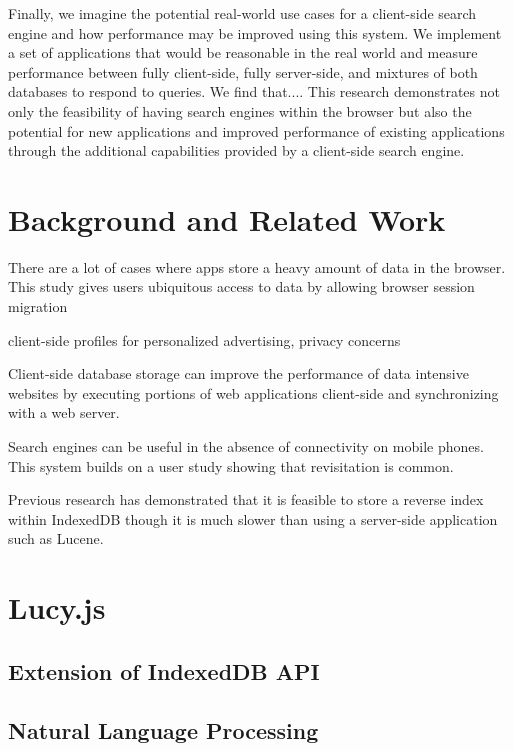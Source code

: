 \documentclass{vldb}
\begin{document}
Finally, we imagine the potential real-world use cases for a client-side search engine and how performance may be improved using this system. We implement a set of applications that would be reasonable in the real world and measure performance between fully client-side, fully server-side, and mixtures of both databases to respond to queries. We find that....
This research demonstrates not only the feasibility of having search engines within the browser but also the potential for new applications and improved performance of existing applications through the additional capabilities provided by a client-side search engine.


\section{Background and Related Work}

There are a lot of cases where apps store a heavy amount of data in the browser. This study gives users ubiquitous access to data by allowing browser session migration \cite{lo2013imagen}

client-side profiles for personalized advertising, privacy concerns \cite{bilenko2011predictive}

Client-side database storage can improve the performance of data intensive websites by executing portions of web applications client-side and synchronizing with a web server.
\cite{benson2010sync}


Search engines can be useful in the absence of connectivity on mobile phones. This system builds on a user study showing that revisitation is common.
\cite{balasubramanian2012findall}

Previous research has demonstrated that it is feasible to store a reverse index within IndexedDB
\cite{lin:jscene} though it is much slower than using a server-side application such as Lucene.




\section{Lucy.js}

\subsection{Extension of IndexedDB API}



\subsection{Natural Language Processing}
\end{document}
